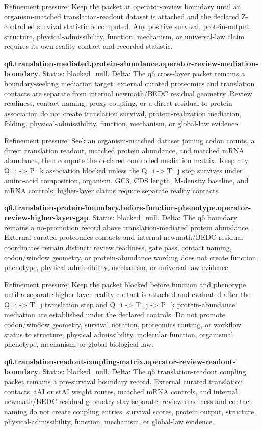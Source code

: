 Refinement pressure: Keep the packet at operator-review boundary until an organism-matched translation-readout dataset is attached and the declared Z-controlled survival statistic is computed. Any positive survival, protein-output, structure, physical-admissibility, function, mechanism, or universal-law claim requires its own reality contact and recorded statistic.

\textbf{q6.translation-mediated.protein-abundance.operator-review-mediation-boundary}. Status: blocked\_null. Delta: The q6 cross-layer packet remains a boundary-seeking mediation target: external curated proteomics and translation contacts are separate from internal newmath/BEDC residual geometry. Review readiness, contact naming, proxy coupling, or a direct residual-to-protein association do not create translation survival, protein-realization mediation, folding, physical-admissibility, function, mechanism, or global-law evidence.

Refinement pressure: Seek an organism-matched dataset joining codon counts, a direct translation readout, matched protein abundance, and matched mRNA abundance, then compute the declared controlled mediation matrix. Keep any Q\_i -> P\_k association blocked unless the Q\_i -> T\_j step survives under amino-acid composition, organism, GC3, CDS length, M-density baseline, and mRNA controls; higher-layer claims require separate reality contacts.

\textbf{q6.translation-protein-boundary.before-function-phenotype.operator-review-higher-layer-gap}. Status: blocked\_null. Delta: The q6 boundary remains a no-promotion record above translation-mediated protein abundance. External curated proteomics contacts and internal newmath/BEDC residual coordinates remain distinct: review readiness, gate pass, contact naming, codon/window geometry, or protein-abundance wording does not create function, phenotype, physical-admissibility, mechanism, or universal-law evidence.

Refinement pressure: Keep the packet blocked before function and phenotype until a separate higher-layer reality contact is attached and evaluated after the Q\_i -> T\_j translation step and Q\_i -> T\_j -> P\_k protein-abundance mediation are established under the declared controls. Do not promote codon/window geometry, survival notation, proteomics routing, or workflow status to structure, physical admissibility, molecular function, organismal phenotype, mechanism, or global biological law.

\textbf{q6.translation-readout-coupling-matrix.operator-review-readout-boundary}. Status: blocked\_null. Delta: The q6 translation-readout coupling packet remains a pre-survival boundary record. External curated translation contacts, tAI or stAI weight routes, matched mRNA controls, and internal newmath/BEDC residual geometry stay separate; review readiness and contact naming do not create coupling entries, survival scores, protein output, structure, physical-admissibility, function, mechanism, or global-law evidence.

